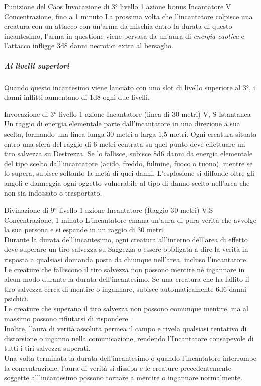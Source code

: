 \DndSpellHeader%
  {Punizione del Caos}
  {Invocazione di 3° livello}
  {1 azione bonus}
  {Incantatore}
  {V}
  {Concentrazione, fino a 1 minuto}
La prossima volta che l'incantatore colpisce una creatura con un attacco con un'arma da mischia entro la durata di questo incantesimo, l'arma in questione viene pervasa da un'aura di \textit{energia caotica} e l'attacco infligge 3d8 danni necrotici extra al bersaglio. 
\subparagraph{Ai livelli superiori}Quando questo incantesimo viene lanciato con uno slot di livello superiore al 3°, i danni inflitti aumentano di 1d8 ogni due livelli.

{Invocazione di 3° livello}
{1 azione}
{Incantatore (linea di 30 metri)}
{V, S}
{Istantanea}
Un raggio di energia elementale parte dall'incantatore in una direzione a sua scelta, formando una linea lunga 30 metri a larga 1,5 metri. Ogni creatura situata entro una sfera del raggio di 6 metri centrata su quel punto deve effettuare un tiro salvezza su Destrezza. Se lo fallisce, subisce 8d6 danni da  energia elementale del tipo scelto dall'incantatore (acido, freddo, fulmine, fuoco o tuono), mentre se lo supera, subisce soltanto la metà di quei danni. 
L'esplosione si diffonde oltre gli angoli e danneggia ogni oggetto vulnerabile al tipo di danno scelto nell'area che non sia indossato o trasportato.

{Divinazione di 9° livello}
{1 azione}
{Incantatore (Raggio 30 metri)}
{V,S}
{Concentrazione, 1 minuto}
L'incantatore emana un'aura di pura verità che avvolge la sua persona e si espande in un raggio di 30 metri. \\ Durante la durata dell'incantesimo, ogni creatura all'interno dell'area di effetto deve superare un tiro salvezza su Saggezza o essere obbligata a dire la verità in risposta a qualsiasi domanda posta da chiunque nell'area, incluso l'incantatore. \\ Le creature che falliscono il tiro salvezza non possono mentire né ingannare in alcun modo durante la durata dell'incantesimo. Se una creatura che ha fallito il tiro salvezza cerca di mentire o ingannare, subisce automaticamente 6d6 danni psichici. \\ Le creature che superano il tiro salvezza non possono comunque mentire, ma al massimo possono rifiutarsi di rispondere. \\ Inoltre, l'aura di verità assoluta permea il campo e rivela qualsiasi tentativo di distorsione o inganno nella comunicazione, rendendo l'Incantatore consapevole di tutti i tiri salvezza superati. \\ Una volta terminata la durata dell'incantesimo o quando l'incantatore interrompe la concentrazione, l'aura di verità si dissipa e le creature precedentemente soggette all'incantesimo possono tornare a mentire o ingannare normalmente.
